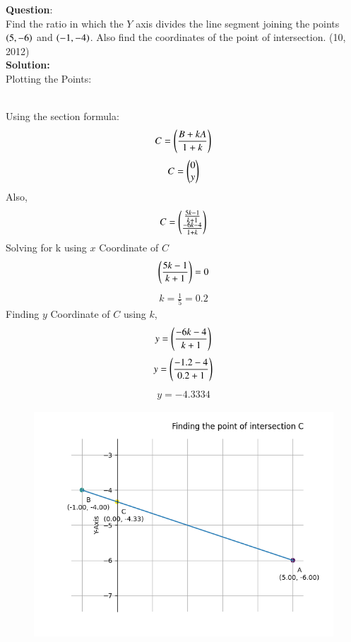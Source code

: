 \documentclass[journal]{IEEEtran}
\begin{document}
\textbf{Question}:\\
Find the ratio in which the $Y$ axis divides the line segment joining the points $\left(5, -6\right)$
and $\left(-1, -4\right)$. Also find the coordinates of the point of intersection. \hfill (10, 2012)
\\ \textbf{Solution: }\\
    Plotting the Points:
    \begin{table}[h!]    
      \centering
      
      \caption{}
    \end{table}\\
Using the section formula:
    \begin{align}
        C  = \left(\frac{B + kA}{1 + k}\right) \label{eq1.1.5.33.1}
    \end{align}
    \begin{align}
        C = \begin{pmatrix}0 \\ y\end{pmatrix} \label{eq1.1.5.33.2}
    \end{align}
Also,
    \begin{align}
        C = \begin{pmatrix}\frac{5k-1}{k+1} \\ \frac{-6k-4}{1+k}\end{pmatrix} \label{eq1.1.5.33.3}
    \end{align}
Solving for k using $x$ Coordinate of $C$
    \begin{align}
        \left(\frac{5k-1}{k+1}\right) = 0  \label{eq1.1.5.33.4}
    \end{align}
    \begin{align}
        k = \frac{1}{5} = 0.2\label{eq1.1.5.33.5}
    \end{align}
Finding $y$ Coordinate of $C$ using $k$,
    \begin{align}
        y = \left(\frac{-6k-4}{k+1}\right)  \label{eq1.1.5.33.6}
    \end{align}
    \begin{align}
        y = \left(\frac{-1.2-4}{0.2+1}\right) \label{eq1.1.5.33.7}
    \end{align}
    \begin{align}
        y = -4.3334 \label{eq1.1.5.33.8}
    \end{align}
    \begin{figure}[h]
        \centering
       \includegraphics[width=0.7\linewidth]{figs/fig1.png}
       \caption{}
       \label{graph}
    \end{figure}
\end{document}
